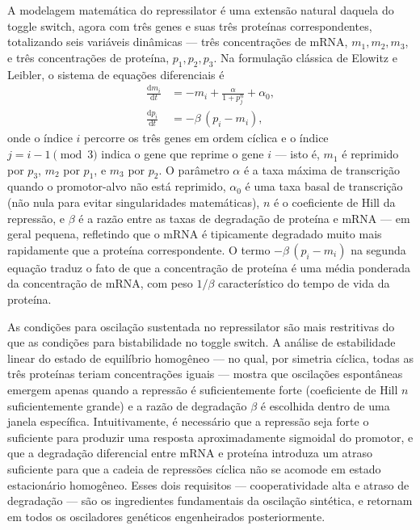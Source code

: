 A modelagem matemática do repressilator é uma extensão natural daquela do toggle switch, agora com três genes e suas três proteínas correspondentes, totalizando seis variáveis dinâmicas --- três concentrações de mRNA, $m_1, m_2, m_3$, e três concentrações de proteína, $p_1, p_2, p_3$. Na formulação clássica de Elowitz e Leibler, o sistema de equações diferenciais é
\begin{align*}
\frac{\mathrm{d}m_i}{\mathrm{d}t} &= -m_i + \frac{\alpha}{1 + p_j^{n}} + \alpha_0, \\
\frac{\mathrm{d}p_i}{\mathrm{d}t} &= -\beta\,(p_i - m_i),
\end{align*}
onde o índice $i$ percorre os três genes em ordem cíclica e o índice $j = i - 1 \pmod{3}$ indica o gene que reprime o gene $i$ --- isto é, $m_1$ é reprimido por $p_3$, $m_2$ por $p_1$, e $m_3$ por $p_2$. O parâmetro $\alpha$ é a taxa máxima de transcrição quando o promotor-alvo não está reprimido, $\alpha_0$ é uma taxa basal de transcrição (não nula para evitar singularidades matemáticas), $n$ é o coeficiente de Hill da repressão, e $\beta$ é a razão entre as taxas de degradação de proteína e mRNA --- em geral pequena, refletindo que o mRNA é tipicamente degradado muito mais rapidamente que a proteína correspondente. O termo $-\beta\,(p_i - m_i)$ na segunda equação traduz o fato de que a concentração de proteína é uma média ponderada da concentração de mRNA, com peso $1/\beta$ característico do tempo de vida da proteína.

As condições para oscilação sustentada no repressilator são mais restritivas do que as condições para bistabilidade no toggle switch. A análise de estabilidade linear do estado de equilíbrio homogêneo --- no qual, por simetria cíclica, todas as três proteínas teriam concentrações iguais --- mostra que oscilações espontâneas emergem apenas quando a repressão é suficientemente forte (coeficiente de Hill $n$ suficientemente grande) e a razão de degradação $\beta$ é escolhida dentro de uma janela específica. Intuitivamente, é necessário que a repressão seja forte o suficiente para produzir uma resposta aproximadamente sigmoidal do promotor, e que a degradação diferencial entre mRNA e proteína introduza um atraso suficiente para que a cadeia de repressões cíclica não se acomode em estado estacionário homogêneo. Esses dois requisitos --- cooperatividade alta e atraso de degradação --- são os ingredientes fundamentais da oscilação sintética, e retornam em todos os osciladores genéticos engenheirados posteriormente.


